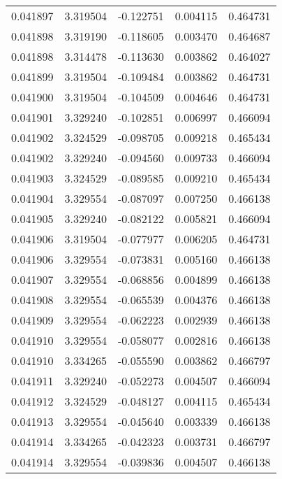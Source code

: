 \begin{tabular}{lrrrr}
0.041897    &  3.319504 & -0.122751 &  0.004115 &             0.464731 \\
0.041898    &  3.319190 & -0.118605 &  0.003470 &             0.464687 \\
0.041898    &  3.314478 & -0.113630 &  0.003862 &             0.464027 \\
0.041899    &  3.319504 & -0.109484 &  0.003862 &             0.464731 \\
0.041900    &  3.319504 & -0.104509 &  0.004646 &             0.464731 \\
0.041901    &  3.329240 & -0.102851 &  0.006997 &             0.466094 \\
0.041902    &  3.324529 & -0.098705 &  0.009218 &             0.465434 \\
0.041902    &  3.329240 & -0.094560 &  0.009733 &             0.466094 \\
0.041903    &  3.324529 & -0.089585 &  0.009210 &             0.465434 \\
0.041904    &  3.329554 & -0.087097 &  0.007250 &             0.466138 \\
0.041905    &  3.329240 & -0.082122 &  0.005821 &             0.466094 \\
0.041906    &  3.319504 & -0.077977 &  0.006205 &             0.464731 \\
0.041906    &  3.329554 & -0.073831 &  0.005160 &             0.466138 \\
0.041907    &  3.329554 & -0.068856 &  0.004899 &             0.466138 \\
0.041908    &  3.329554 & -0.065539 &  0.004376 &             0.466138 \\
0.041909    &  3.329554 & -0.062223 &  0.002939 &             0.466138 \\
0.041910    &  3.329554 & -0.058077 &  0.002816 &             0.466138 \\
0.041910    &  3.334265 & -0.055590 &  0.003862 &             0.466797 \\
0.041911    &  3.329240 & -0.052273 &  0.004507 &             0.466094 \\
0.041912    &  3.324529 & -0.048127 &  0.004115 &             0.465434 \\
0.041913    &  3.329554 & -0.045640 &  0.003339 &             0.466138 \\
0.041914    &  3.334265 & -0.042323 &  0.003731 &             0.466797 \\
0.041914    &  3.329554 & -0.039836 &  0.004507 &             0.466138 \\

\end{tabular}
